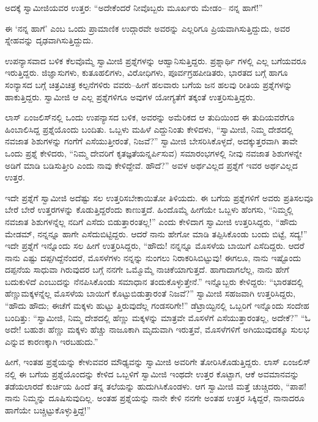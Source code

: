ಅದಕ್ಕೆ ಸ್ವಾಮೀಜಿಯವರ ಉತ್ತರ: “ಅದೇಕೆಂದರೆ ನೀವೊಬ್ಬರು ಮೂರ್ಖರು ಮೇಡಂ– ನನ್ನ ಹಾಗೆ!”

ಈ ‘ನನ್ನ ಹಾಗೆ’ ಎಂಬ ಒಂದು ಪ್ರಾಮಾಣಿಕ ಉದ್ಗಾರವೇ ಅವರನ್ನು ಎಲ್ಲರಿಗೂ ಪ್ರಿಯವಾಗಿಸುತ್ತಿದ್ದುದು, ಅವರ ಸ್ನೇಹವನ್ನು ದೃಢವಾಗಿಸುತ್ತಿದ್ದುದು.

ಉಪನ್ಯಾಸವಾದ ಬಳಿಕ ಕೆಲವೊಮ್ಮೆ ಸ್ವಾಮೀಜಿ ಪ್ರಶ್ನೆಗಳನ್ನು ಆಹ್ವಾನಿಸುತ್ತಿದ್ದರು. ಪ್ರಶ್ನಾರ್ಥಿ ಗಳಲ್ಲಿ ಎಲ್ಲ ಬಗೆಯವರೂ ಇರುತ್ತಿದ್ದರು. ಜಿಜ್ಞಾಸುಗಳು, ಕುತೂಹಲಿಗಳು, ವಿರೋಧಿಗಳು, ಪೂರ್ವಗ್ರಹಪೀಡಿತರು, ಭಾರತದ ಬಗ್ಗೆ ಹಾಗೂ ಸಂನ್ಯಾಸದ ಬಗ್ಗೆ ಚಿತ್ರವಿಚಿತ್ರ ಕಲ್ಪನೆಗಳಿರು ವವರು–ಹೀಗೆ ಹಲವಾರು ಬಗೆಯ ಜನ ಹಲವು ರೀತಿಯ ಪ್ರಶ್ನೆಗಳನ್ನು ಹಾಕುತ್ತಿದ್ದರು. ಸ್ವಾಮೀಜಿ ಆ ಎಲ್ಲ ಪ್ರಶ್ನೆಗಳಿಗೂ ಅವುಗಳ ಯೋಗ್ಯತೆಗೆ ತಕ್ಕಂತೆ ಉತ್ತರಿಸುತ್ತಿದ್ದರು.

ಲಾಸ್ ಏಂಜಲಿಸ್​ನಲ್ಲಿ ಒಂದು ಉಪನ್ಯಾಸದ ಬಳಿಕ, ಅವರನ್ನು ಅಮೆರಿಕದ ಆ ತುದಿಯಿಂದ ಈ ತುದಿಯವರೆಗೂ ಹಿಂಬಾಲಿಸಿದ್ದ ಪ್ರಶ್ನೆಯೊಂದು ಬಂದಿತು. ಒಬ್ಬಳು ಮಹಿಳೆ ಎದ್ದುನಿಂತು ಕೇಳಿದಳು, “ಸ್ವಾಮೀಜಿ, ನಿಮ್ಮ ದೇಶದಲ್ಲಿ ನವಜಾತ ಶಿಶುಗಳನ್ನು ಗಂಗೆಗೆ ಎಸೆಯುತ್ತೀರಂತೆ, ನಿಜವೆ?” ಸ್ವಾಮೀಜಿ ಬೇಸರಿಸಿಕೊಳ್ಳದೆ, ಅದಕ್ಕುತ್ತರವಾಗಿ ತಾವೇ ಒಂದು ಪ್ರಶ್ನೆ ಕೇಳಿದರು, “ನಿಮ್ಮ ದೇವರಿಗೆ ಕೃತಜ್ಞತೆಯನ್ನರ್ಪಿಸುವ) ಸಮಾರಂಭಗಳಲ್ಲಿ ನೀವು ನವಜಾತ ಶಿಶುಗಳನ್ನೇ ಅಡಿಗೆ ಮಾಡಿ ಬಡಿಸುತ್ತೀರಿ ಎಂದು ನಾವು ಕೇಳಿದ್ದೇವೆ. ಹೌದೆ?” ಅವಳ ಅರ್ಥವಿಲ್ಲದ ಪ್ರಶ್ನೆಗೆ ಇವರ ಅರ್ಥವಿಲ್ಲದ ಉತ್ತರ.

ಇದೇ ಪ್ರಶ್ನೆಗೆ ಸ್ವಾಮೀಜಿ ಅದೆಷ್ಟು ಸಲ ಉತ್ತರಿಸಬೇಕಾಯಿತೋ ತಿಳಿಯದು. ಈ ಬಗೆಯ ಪ್ರಶ್ನೆಗಳಿಗೆ ಅವರು ಪ್ರತಿಸಲವೂ ಬೇರೆ ಬೇರೆ ಉತ್ತರಗಳನ್ನು ಕೊಡುತ್ತಿದ್ದರೆಂದು ಕಾಣುತ್ತದೆ. ಹಿಂದೊಮ್ಮೆ ಹೀಗೆಯೇ ಒಬ್ಬಳು ಹೆಂಗಸು, “ನಿಮ್ಮಲ್ಲಿ ನವಜಾತ ಶಿಶುಗಳನ್ನೆಲ್ಲ ನದಿಗೆ ಎಸೆದು ಬಿಡುತ್ತಾರಂತಲ್ಲ!” ಎಂದು ಕೇಳಿದಾಗ ಸ್ವಾಮೀಜಿ ಉತ್ತರಿಸಿದ್ದರು, “ಹೌದು ಮೇಡಮ್, ನನ್ನನ್ನೂ ಹಾಗೇ ಎಸೆದುಬಿಟ್ಟಿದ್ದರು. ಆದರೆ ನಾನು ಹೇಗೋ ಮಾಡಿ ತಪ್ಪಿಸಿಕೊಂಡು ಬಂದು ಬಿಟ್ಟೆ, ಸದ್ಯ!” ಇದೇ ಪ್ರಶ್ನೆಗೆ ಇನ್ನೊಂದು ಸಲ ಹೀಗೆ ಉತ್ತರಿಸಿದ್ದರು, “ಹೌದು! ನನ್ನನ್ನೂ ಮೊಸಳೆಯ ಬಾಯಿಗೆ ಎಸೆದಿದ್ದರು. ಆದರೆ ನಾನು ಎಷ್ಟು ದಪ್ಪಗಿದ್ದೆನೆಂದರೆ, ಮೊಸಳೆಗಳು ನನ್ನನ್ನು ನುಂಗಲು ನಿರಾಕರಿಸಿಬಿಟ್ಟುವು! ಈಗಲೂ, ನಾನು ಇಷ್ಟೊಂದು ದಪ್ಪನೆಯ ಸಾಧುವಾ ಗಿರುವುದರ ಬಗ್ಗೆ ನನಗೇ ಒಮ್ಮೊಮ್ಮೆ ನಾಚಿಕೆಯಾಗುತ್ತದೆ. ಹಾಗಾದಾಗಲೆಲ್ಲ, ನಾನು ಹೇಗೆ ಬದುಕುಳಿದೆ ಎಂಬುದನ್ನು ನೆನಪಿಸಿಕೊಂಡು ಸಮಾಧಾನ ತಂದುಕೊಳ್ಳುತ್ತೇನೆ.” ಇನ್ನೊಬ್ಬರು ಕೇಳಿದ್ದರು: “ಭಾರತದಲ್ಲಿ ಹೆಣ್ಣುಮಕ್ಕಳನ್ನೆಲ್ಲ ಮೊಸಳೆಯ ಬಾಯಿಗೆ ಕೊಟ್ಟುಬಿಡುತ್ತಾರಂತೆ ನಿಜವೆ?” ಸ್ವಾಮೀಜಿ ಸಹಜವಾಗಿ ಉತ್ತರಿಸಿದ್ದರು, “ಹೌದು ಹೌದು; ಈಚೆಗೆ ಮಕ್ಕಳು ಹುಟ್ಟು ತ್ತಿರುವುದೆಲ್ಲ ಗಂಡಸರಿಗೇ!” ಡೆಟ್ರಾಯ್ಟಿನಲ್ಲಿ ಒಬ್ಬರಿಗೆ ಇನ್ನೊಂದು ಸಂದೇಹ ಬಂದಿತ್ತು: “ಸ್ವಾಮೀಜಿ, ನಿಮ್ಮ ದೇಶದಲ್ಲಿ ಹೆಣ್ಣು ಮಕ್ಕಳನ್ನು ಮಾತ್ರವೇ ಮೊಸಳೆಗೆ ಎಸೆಯುತ್ತಾರಂತಲ್ಲ, ಅದೇಕೆ?” “ಓ ಅದೇ! ಬಹುಶಃ ಹೆಣ್ಣು ಮಕ್ಕಳು ಹೆಚ್ಚು ನಾಜೂಕಾಗಿ ಮೃದುವಾಗಿ ಇರುತ್ತವೆ, ಮೊಸಳೆಗಳಿಗೆ ಅಗಿಯುವುದಕ್ಕೂ ಸುಲಭ ಎನ್ನುವ ಕಾರಣಕ್ಕಾಗಿ ಇರಬಹುದು.”

ಹೀಗೆ, ಇಂತಹ ಪ್ರಶ್ನೆಯನ್ನು ಕೇಳುವವರ ಮೌಢ್ಯವನ್ನು ಸ್ವಾಮೀಜಿ ಅವರಿಗೇ ತೋರಿಸಿಕೊಡುತ್ತಿದ್ದರು. ಲಾಸ್ ಏಂಜಲಿಸ್​ನಲ್ಲಿ ಈ ಬಗೆಯ ಪ್ರಶ್ನೆಯೊಂದನ್ನು ಕೇಳಿದ ಒಬ್ಬಳಿಗೆ ಸ್ವಾಮೀಜಿ ಇಂಥದೇ ಉತ್ತರ ಕೊಟ್ಟಾಗ, ಆಕೆ ಅವಮಾನವನ್ನು ತಡೆಯಲಾರದೆ ಕುರ್ಚಿಯ ಹಿಂದೆ ತನ್ನ ತಲೆಯನ್ನು ಹುದುಗಿಸಿಕೊಂಡಳು. ಆಗ ಸ್ವಾಮೀಜಿ ಮತ್ತೆ ಚುಚ್ಚಿದರು, “ಪಾಪ! ನಾನು ನಿಮ್ಮನ್ನು ದೂಷಿಸುವುದಿಲ್ಲ. ಅಂತಹ ಪ್ರಶ್ನೆಯನ್ನು ನಾನೇ ಕೇಳಿ ನನಗೇ ಅಂತಹ ಉತ್ತರ ಸಿಕ್ಕಿದ್ದರೆ, ನಾನಾದರೂ ಹಾಗೆಯೇ ಬಚ್ಚಿಟ್ಟುಕೊಳ್ಳುತ್ತಿದ್ದೆ!”

